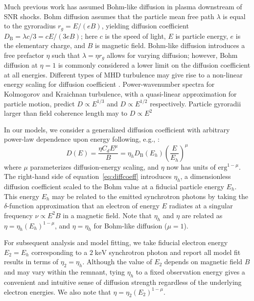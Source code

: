\documentclass[iop, apj, numberedappendix, twocolappendix]{emulateapj}
\newcommand*{\mt}{\mathrm}
\newcommand*{\unit}[1]{\;\mt{#1}}  %
\begin{document}
Much previous work has assumed Bohm-like diffusion in plasma downstream of SNR
shocks.  Bohm diffusion assumes that the particle mean free path $\lambda$ is
equal to the gyroradius $r_g = E/(eB)$, yielding diffusion coefficient
$D_{\mt{B}} = \lambda c / 3 = c E / (3 e B)$; here $c$ is the speed of light,
$E$ is particle energy, $e$ is the elementary charge, and $B$ is magnetic
field.  Bohm-like diffusion introduces a free prefactor $\eta$ such that
$\lambda = \eta r_g$ allows for varying diffusion; however, Bohm diffusion at
$\eta = 1$ is commonly considered a lower limit on the diffusion coefficient at
all energies.
Different types of MHD turbulence may give rise to a non-linear energy
scaling for diffusion coefficient \citep{giacalone1999, reynolds2004}.
Power-wavenumber spectra for Kolmogorov and Kraichnan turbulence, with a
quasi-linear approximation for particle motion,
predict $D \propto E^{1/3}$ and $D \propto E^{1/2}$ respectively.
Particle gyroradii larger than field coherence length may to $D \propto E^{2}$

In our models, we consider a generalized diffusion coefficient with arbitrary
power-law dependence upon energy following, e.g., \citet{parizot2006}:
\begin{equation} \label{eq:diffcoeff}
    D(E) = \frac{\eta C_d E^\mu}{B}
         = \eta_h D_{\mt{B}}\left(E_h\right) \left(\frac{E}{E_h}\right)^\mu
\end{equation}
where $\mu$ parameterizes diffusion-energy scaling, and $\eta$ now has units
of $\mathrm{erg}^{1-\mu}$.
The right-hand side of equation~\eqref{eq:diffcoeff} introduces $\eta_h$, a
dimensionless diffusion coefficient scaled to the Bohm value at a fiducial
particle energy $E_h$.  This energy $E_h$ may be related to the emitted
synchrotron photons by taking the $\delta$-function approximation that an
electron of energy $E$ radiates at a singular frequency $\nu \propto E^2 B$ in
a magnetic field.  Note that $\eta_h$ and $\eta$ are related as
$\eta = \eta_h (E_h)^{1-\mu}$, and $\eta = \eta_h$ for Bohm-like diffusion
($\mu = 1$).

For subsequent analysis and model fitting, we take fiducial electron energy
$E_2 = E_h$ corresponding to a $2 \unit{keV}$ synchrotron photon and report all
model fit results in terms of $\eta_2 = \eta_h$.  Although the value of $E_2$
depends on magnetic field $B$ and may vary within the remnant, tying $\eta_h$
to a fixed observation energy gives a convenient and intuitive sense of
diffusion strength regardless of the underlying electron energies.
We also note that $\eta = \eta_2 (E_2)^{1-\mu}$.
\end{document}

